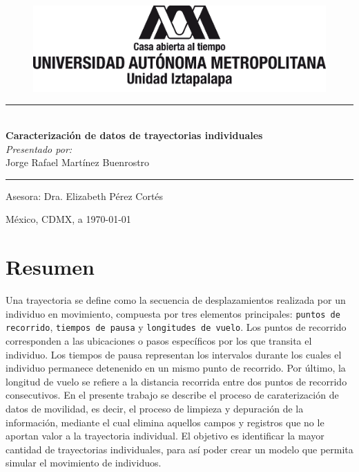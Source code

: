 \documentclass[letterpaper,11pt,spanish]{report}
\begin{document}
\thispagestyle{empty}

\begin{figure}[h]
    \centering
    \includegraphics[scale=0.6]{img/logoUAM.png}
\end{figure}

\begin{center}
    \rule{\textwidth}{0.5pt}
    \\[0.7em]
    {\LARGE\bfseries Caracterización de datos de trayectorias individuales}\\[1cm]
    {\normalsize\itshape Presentado por:}\\
    {\large Jorge Rafael Martínez Buenrostro}
    \rule{\textwidth}{0.5pt}
\end{center}

\vspace{2cm}
\begin{center}
    {\large Asesora: Dra. Elizabeth Pérez Cortés}    
\end{center}

\vfill  
\begin{center}
    México, CDMX, a \today
\end{center}

\vspace{2cm}

\setcounter{page}{0}
\pagestyle{plain}
\chapter*{Resumen}
Una trayectoria se define como la secuencia de desplazamientos realizada por un individuo en movimiento, compuesta por tres elementos principales: \texttt{puntos de recorrido}, \texttt{tiempos de pausa} y \texttt{longitudes de vuelo}. Los puntos de recorrido corresponden a las ubicaciones o pasos específicos por los que transita el individuo. Los tiempos de pausa representan los intervalos durante los cuales el individuo permanece detenenido en un mismo punto de recorrido. Por último, la longitud de vuelo se refiere a la distancia recorrida entre dos puntos de recorrido consecutivos. En el presente trabajo se describe el proceso de caraterización de datos de movilidad, es decir, el proceso de limpieza y depuración de la información, mediante el cual elimina aquellos campos y registros que no le aportan valor a la trayectoria individual. El objetivo es identificar la mayor cantidad de trayectorias individuales, para así poder crear un modelo que permita simular el movimiento de individuos.
\end{document}
